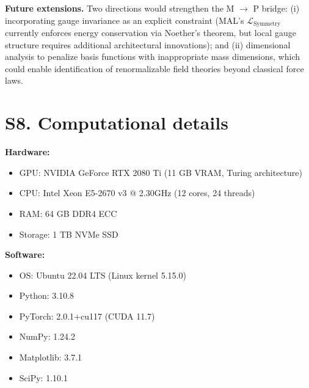 \documentclass[aps,pre,reprint,superscriptaddress]{revtex4-2}
\begin{document}
\textbf{Future extensions.} Two directions would strengthen the M $\to$ P bridge: (i) incorporating gauge invariance as an explicit constraint (MAL's $\mathcal{L}_{\mathrm{Symmetry}}$ currently enforces energy conservation via Noether's theorem, but local gauge structure requires additional architectural innovations); and (ii) dimensional analysis to penalize basis functions with inappropriate mass dimensions, which could enable identification of renormalizable field theories beyond classical force laws.

\section{S8. Computational details}
\textbf{Hardware:}
\begin{itemize}
\item GPU: NVIDIA GeForce RTX 2080 Ti (11 GB VRAM, Turing architecture)
\item CPU: Intel Xeon E5-2670 v3 @ 2.30GHz (12 cores, 24 threads)
\item RAM: 64 GB DDR4 ECC
\item Storage: 1 TB NVMe SSD
\end{itemize}

\textbf{Software:}
\begin{itemize}
\item OS: Ubuntu 22.04 LTS (Linux kernel 5.15.0)
\item Python: 3.10.8
\item PyTorch: 2.0.1+cu117 (CUDA 11.7)
\item NumPy: 1.24.2
\item Matplotlib: 3.7.1
\item SciPy: 1.10.1
\end{itemize}
\end{document}

